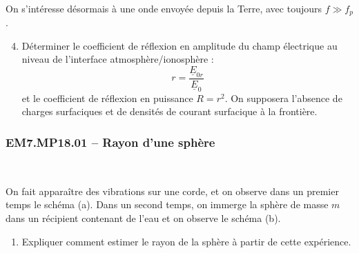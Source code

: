 \begin{minipage}[t]{0.3\textwidth} %
~
\vspace{0em}


\end{minipage}
\hfill %
\begin{minipage}[t]{0.65\textwidth} %
On s'intéresse désormais à une onde envoyée depuis la Terre, avec toujours $f \gg f_p$.

\begin{enumerate}
    \setcounter{enumi}{3}
    \item Déterminer le coefficient de réflexion en amplitude du champ électrique au niveau de l'interface atmosphère/ionosphère :
    \[
    r = \frac{\underline{E}_{0r}}{\underline{E}_0}
    \]
    et le coefficient de réflexion en puissance $R = r^2$. On supposera l'absence de charges surfaciques et de densités de courant surfacique à la frontière.
\end{enumerate}
\end{minipage}


\newpage
\subsubsection*{EM7.MP18.01 -- Rayon d'une sphère }

\begin{minipage}[t]{0.4\textwidth} %
~
\vspace{0em}


\end{minipage}
\hfill %
\begin{minipage}[t]{0.55\textwidth} %

\vspace{2em}

On fait apparaître des vibrations sur une corde, et on observe dans un premier temps le schéma (a). Dans un second temps, on immerge la sphère de masse $m$ dans un récipient contenant de l'eau et on observe le schéma (b).

\begin{enumerate}
    \item Expliquer comment estimer le rayon de la sphère à partir de cette expérience.
\end{enumerate}
\end{minipage}



